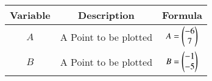 \begin{center}
    \begin{tabular}{|c|c|c|} 
        \hline
            \textbf{Variable} & \textbf{Description} & \textbf{Formula} \\ 
        \hline
            $A$   & A Point to be plotted & $A = \begin{pmatrix}-6 \\ 7\end{pmatrix}$ \\ 
        \hline
            $B$   &  A Point to be plotted &  $B = \begin{pmatrix}-1 \\ -5\end{pmatrix}$\\ 
        \hline
    \end{tabular}
\end{center}  



